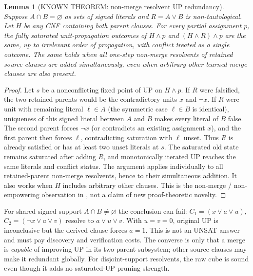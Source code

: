 \documentclass[10pt]{article}
\newtheorem{lemma}[theorem]{Lemma}
\begin{document}
\begin{lemma}[KNOWN THEOREM: non-merge resolvent UP redundancy]\label{lem:nonmerge}
Suppose $A\cap B=\varnothing$ as sets of \emph{signed literals} and $R=A\lor B$ is non-tautological. Let $H$ be any CNF containing both parent clauses. For every partial assignment $p$, the fully saturated unit-propagation outcomes of $H\land p$ and $(H\land R)\land p$ are the same, up to irrelevant order of propagation, with conflict treated as a single outcome. The same holds when all one-step non-merge resolvents of retained source clauses are added simultaneously, even when arbitrary other learned merge clauses are also present.
\end{lemma}
\begin{proof}
Let $s$ be a nonconflicting fixed point of UP on $H\land p$. If $R$ were falsified, the two retained parents would be the contradictory units $x$ and $\neg x$. If $R$ were unit with remaining literal $\ell\in A$ (the symmetric case $\ell\in B$ is identical), uniqueness of this signed literal between $A$ and $B$ makes every literal of $B$ false. The second parent forces $\neg x$ (or contradicts an existing assignment $x$), and the first parent then forces $\ell$, contradicting saturation with $\ell$ unset. Thus $R$ is already satisfied or has at least two unset literals at $s$. The saturated old state remains saturated after adding $R$, and monotonically iterated UP reaches the same literals and conflict status. The argument applies individually to all retained-parent non-merge resolvents, hence to their simultaneous addition. It also works when $H$ includes arbitrary other clauses. This is the non-merge / non-empowering observation in \cite[Lemma~3.3]{Babka2013}, not a claim of new proof-theoretic novelty.
\end{proof}

For shared signed support $A\cap B\ne\varnothing$ the conclusion can fail: $C_1=(x\lor a\lor u)$, $C_2=(\neg x\lor a\lor v)$ resolve to $a\lor u\lor v$. With $u=v=0$, original UP is inconclusive but the derived clause forces $a=1$. This is not an UNSAT answer and must pay discovery and verification costs. The converse is only that a merge is \emph{capable} of improving UP in its two-parent subsystem; other source clauses may make it redundant globally. For disjoint-support resolvents, the raw cube is sound even though it adds no saturated-UP pruning strength.
\end{document}
